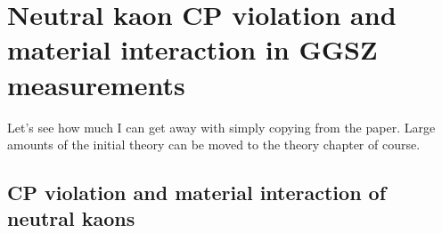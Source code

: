 

\chapter{Neutral kaon CP violation and material interaction in GGSZ measurements}
\label{ch:4-KS-CPV}


Let's see how much I can get away with simply copying from the paper.
Large amounts of the initial theory can be moved to the theory chapter of course.

\section{CP violation and material interaction of neutral kaons} %
\label{sec:cp_violation_and_material_interaction_of_neutral_kaons}


